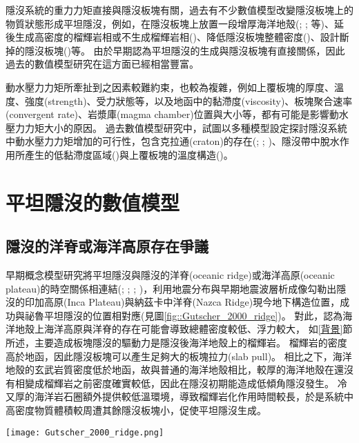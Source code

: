 隱沒系統的重力力矩直接與隱沒板塊有關，過去有不少數值模型改變隱沒板塊上的物質狀態形成平坦隱沒，例如，在隱沒板塊上放置一段增厚海洋地殼(\citealp{van2002role}; \citealp{Liu2016}; \citealp{Hu2016}等)、延後生成高密度的榴輝岩相或不生成榴輝岩相(\citealp{van2002role})、降低隱沒板塊整體密度(\citealp{Gerya2009})、設計斷掉的隱沒板塊(\citealp{Liu2016})等。
由於早期認為平坦隱沒的生成與隱沒板塊有直接關係，因此過去的數值模型研究在這方面已經相當豐富。

動水壓力力矩所牽扯到之因素較難約束，也較為複雜，例如上覆板塊的厚度、溫度、強度(strength)、受力狀態等，以及地函中的黏滯度(viscosity)、板塊聚合速率(convergent rate)、岩漿庫(magma chamber)位置與大小等，都有可能是影響動水壓力力矩大小的原因。
過去數值模型研究中，試圖以多種模型設定探討隱沒系統中動水壓力力矩增加的可行性，包含克拉通(craton)的存在(\citealp{Manea2012Chile}; \citealp{Liu2016}; \citealp{Hu2016})、隱沒帶中脫水作用所產生的低黏滯度區域(\citealp{Manea2007})與上覆板塊的溫度構造(\citealp{Thermal2012})。

\section{平坦隱沒的數值模型}\label{平坦隱沒的數值模型}
\subsection{隱沒的洋脊或海洋高原存在爭議}\label{隱沒的洋脊或海洋高原存在爭議}
早期概念模型研究將平坦隱沒與隱沒的洋脊(oceanic ridge)或海洋高原(oceanic plateau)的時空關係相連結(\citealp{pilger1981plate}; \citealp{henderson1984mesozoic}; \citealp{Gutscher2000A}; \citealp{gutscher2002andean})，\citet{Gutscher2000A}利用地震分布與早期地震波層析成像勾勒出隱沒的印加高原(Inca Plateau)與納茲卡中洋脊(Nazca Ridge)現今地下構造位置，成功與祕魯平坦隱沒的位置相對應(見圖\ref{fig::Gutscher_2000_ridge})。
對此，\citet{Gutscher2000A}認為海洋地殼上海洋高原與洋脊的存在可能會導致總體密度較低、浮力較大，
如\ref{背景}節所述，主要造成板塊隱沒的驅動力是隱沒後海洋地殼上的榴輝岩。
榴輝岩的密度高於地函，因此隱沒板塊可以產生足夠大的板塊拉力(slab pull)。
相比之下，海洋地殼的玄武岩質密度低於地函，故與普通的海洋地殼相比，較厚的海洋地殼在還沒有相變成榴輝岩之前密度確實較低，因此在隱沒初期能造成低傾角隱沒發生。
冷又厚的海洋岩石圈額外提供較低溫環境，導致榴輝岩化作用時間較長，於是系統中高密度物質體積較周遭其餘隱沒板塊小，促使平坦隱沒生成。

\begin{figure*}[htp]
    \centering
    \texttt{[image: Gutscher\_2000\_ridge.png]}
    \caption[南美洲板塊構造圖，摘自\citet{Gutscher2000A}]{南美洲板塊構造圖，摘自\citet{Gutscher2000A}。粗黑線標出平坦隱沒段，灰色陰影區標示隱沒的海洋高原與洋脊，三角形為活動火山。板塊聚合速率由白色箭頭標出，參考自\citet{demets1990current}。
    }
    \label{fig::Gutscher_2000_ridge}
\end{figure*}

